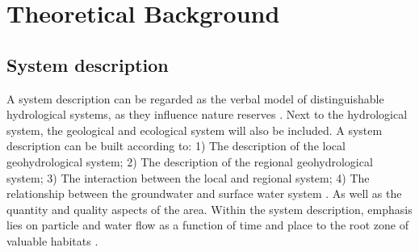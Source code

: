 \chapter{Theoretical Background}
\label{chapter:Theoretical Background}


\section{System description}
A system description can be regarded as the verbal model of distinguishable hydrological systems, as they influence nature reserves \cite{ganswijk-1988}. Next to the hydrological system, the geological and ecological system will also be included. A system description can be built according to: 1) The description of the local geohydrological system; 2) The description of the regional geohydrological system; 3) The interaction between the local and regional system; 4) The relationship between the groundwater and surface water system \cite{koomen-2011}. As well as the quantity and quality aspects of the area. Within the system description, emphasis lies on particle and water flow as a function of time and place to the root zone of valuable habitats \cite{ganswijk-1988}. 

